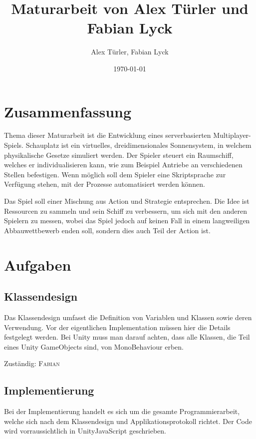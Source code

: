 \documentclass[a4paper]{article}
\title {Maturarbeit von Alex Türler und Fabian Lyck}
\author {Alex Türler, Fabian Lyck}
\date {\today}
\begin{document}
\newcommand{\name}[1]{\textsc{#1}}
\renewcommand{\labelenumi}{\arabic{enumi}.}
\renewcommand{\labelenumii}{\arabic{enumi}.\arabic{enumii}}

\maketitle
\section{Zusammenfassung}
Thema dieser Maturarbeit ist die Entwicklung eines serverbasierten Multiplayer-Spiels. Schauplatz ist ein virtuelles, dreidimensionales Sonnensystem, in welchem physikalische Gesetze simuliert werden. Der Spieler steuert ein Raumschiff, welches er individualisieren kann, wie zum Beispiel Antriebe an verschiedenen Stellen befestigen. Wenn möglich soll dem Spieler eine Skriptsprache zur Verfügung stehen, mit der Prozesse automatisiert werden können.

Das Spiel soll einer Mischung aus Action und Strategie entsprechen. Die Idee ist Ressourcen zu sammeln und sein Schiff zu verbessern, um sich mit den anderen Spielern zu messen, wobei das Spiel jedoch auf keinen Fall in einem langweiligen Abbauwettbewerb enden soll, sondern dies auch Teil der Action ist.

\section{Aufgaben}
\subsection{Klassendesign}
Das Klassendesign umfasst die Definition von Variablen und Klassen sowie deren Verwendung. Vor der eigentlichen Implementation müssen hier die Details festgelegt werden.  Bei Unity muss man darauf achten, dass alle Klassen, die Teil eines Unity GameObjects sind, von MonoBehaviour erben.

Zuständig: \name{Fabian}

\subsection{Implementierung}

Bei der Implementierung handelt es sich um die gesamte Programmierarbeit, welche sich nach dem Klassendesign und Applikationsprotokoll richtet. Der Code wird vorraussichtlich in UnityJavaScript geschrieben.
\end{document}
